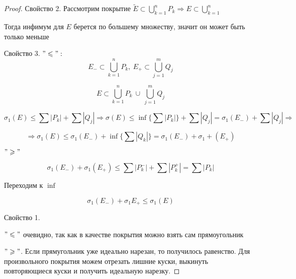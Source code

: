 \begin{proof}
    Свойство 2. Рассмотрим покрытие $\widetilde{E} \subset \bigcup\limits_{k=1}^n P_k
    \Rightarrow E \subset \bigcup\limits_{k=1}^n$

    Тогда инфимум для $E$ берется по большему множеству, значит он может быть только меньше

    Свойство 3. $"\leqslant":$
    \[E_{-} \subset \bigcup\limits_{k=1}^n P_k,\ 
    E_{+} \subset \bigcup\limits_{j=1}^m Q_j\]

    \[E \subset \bigcup\limits_{k=1}^n P_k\ \cup\ \bigcup\limits_{j=1}^m Q_j\]

    \[\sigma_1(E) \leqslant \sum |P_k| + \sum |Q_j| \Rightarrow \sigma(E) \leqslant \inf
    \Big\{ \sum |P_k| \Big\} + \sum |Q_j| = \sigma_1(E_{-}) + \sum |Q_j| \Rightarrow \]

    \[ \Rightarrow \sigma_1(E) \leqslant \sigma_1(E_{-}) + \inf \Big\{ \sum |Q_k| \Big\} =
    \sigma_1(E_{-}) + \sigma_1 + (E_{+}) \]

    $"\geqslant"$

    \[ \sigma_1(E_{-}) + \sigma_1(E_{+}) \leqslant \sum |P_k^{-}| + \sum |P_k^{+}| = \sum |P_k|\]

    Переходим к $\inf$

    \[ \sigma_1(E_{-}) + \sigma_1{E_{+}} \leqslant \sigma_1(E) \]

    Свойство 1.

    $"\leqslant"$ очевидно, так как в качестве покрытия можно взять сам прямоугольник

    $"\geqslant"$. Если прямугольник уже идеально нарезан, то получилось равенство.
    Для произвольного покрытия можем отрезать лишние куски, выкинуть повторяющиеся куски и получить идеальную нарезку.
\end{proof}